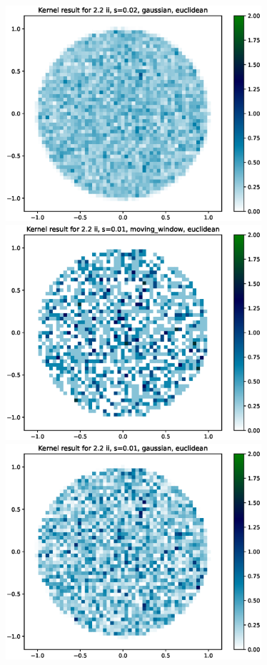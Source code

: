 \documentclass{article}
\begin{document}
\includegraphics[height=8cm]{comparisons//Kernel_result_2-2ii_s_0-02_gaussian_euclidean.eps}  \\
\hspace*{-1.5cm}\includegraphics[height=8cm]{comparisons//Kernel_result_2-2ii_s_0-01_moving_window_euclidean.eps} \hspace*{-1.5cm}
\includegraphics[height=8cm]{comparisons//Kernel_result_2-2ii_s_0-01_gaussian_euclidean.eps}  \\
\end{document}

